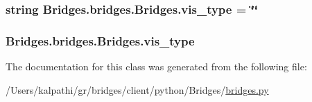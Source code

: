 \subsubsection[{vis\+\_\+type}]{\setlength{\rightskip}{0pt plus 5cm}string Bridges.\+bridges.\+Bridges.\+vis\+\_\+type = \char`\"{}\char`\"{}\hspace{0.3cm}{\ttfamily [static]}}\label{class_bridges_1_1bridges_1_1_bridges_aec289f4a18867c2fef080a4faa092e8e}
\hypertarget{class_bridges_1_1bridges_1_1_bridges_a0c3729b756ec663959e99210d986638e}{}
\subsubsection[{vis\+\_\+type}]{\setlength{\rightskip}{0pt plus 5cm}Bridges.\+bridges.\+Bridges.\+vis\+\_\+type}\label{class_bridges_1_1bridges_1_1_bridges_a0c3729b756ec663959e99210d986638e}


The documentation for this class was generated from the following file\+:\begin{DoxyCompactItemize}
\item 
/\+Users/kalpathi/gr/bridges/client/python/\+Bridges/\hyperlink{bridges_8py}{bridges.\+py}\end{DoxyCompactItemize}
